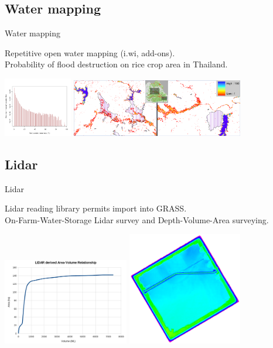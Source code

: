 \documentclass[xcolor=dvipsnames,beamer]{beamer} %
\begin{document}
\subsection{Water mapping}
\begin{frame}[fragile]{Water mapping}

Repetitive open water mapping (i.wi, add-ons).\\
Probability of flood destruction on rice crop area in Thailand.

\begin{center}
 \includegraphics[width=3cm]{flood0}
 \hspace{10mm}
 \includegraphics[width=7.5cm]{flood1}
\end{center}

\end{frame}

\subsection{Lidar}
\begin{frame}[fragile]{Lidar}

Lidar reading library permits import into GRASS.\\
On-Farm-Water-Storage Lidar survey and Depth-Volume-Area surveying.

\begin{center}
 \includegraphics[width=5.5cm]{ofs1}
 \hspace{10mm}
 \includegraphics[width=5cm]{ofs2}
\end{center}

\end{frame}
\end{document}
